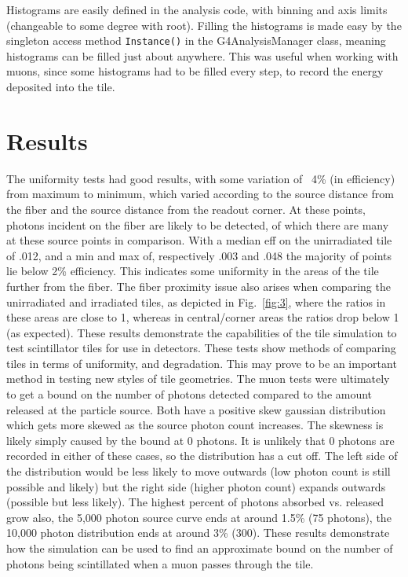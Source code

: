 \documentclass[11pt,twoside,a4paper,dn,final]{cms-tdr}
\begin{document}
	Histograms are easily defined in the analysis code, with binning and axis limits (changeable to some degree with root). Filling the histograms is made easy by the singleton access method \verb|Instance()| in the G4AnalysisManager class, meaning histograms can be filled just about anywhere. This was useful when working with muons, since some histograms had to be filled every step, to record the energy deposited into the tile. 


\section{Results}
	The uniformity tests had good results, with some variation of ~4\% (in efficiency) from maximum to minimum, which varied according to the source distance from the fiber and the source distance from the readout corner. At these points, photons incident on the fiber are likely to be detected, of which there are many at these source points in comparison. With a median eff on the unirradiated tile of .012, and a min and max of, respectively .003 and .048 the majority of points lie below 2\% efficiency. This indicates some uniformity in the areas of the tile further from the fiber. The fiber proximity issue also arises when comparing the unirradiated and irradiated tiles, as depicted in Fig.~\ref{fig:3}, where the ratios in these areas are close to 1, whereas in central/corner areas the ratios drop below 1 (as expected). These results demonstrate the capabilities of the tile simulation to test scintillator tiles for use in detectors. These tests show methods of comparing tiles in terms of uniformity, and degradation. This may prove to be an important method in testing new styles of tile geometries.
	The muon tests were ultimately to get a bound on the number of photons detected compared to the amount released at the particle source.  Both have a positive skew gaussian distribution which gets more skewed as the source photon count increases. The skewness is likely simply caused by the bound at 0 photons. It is unlikely that 0 photons are recorded in either of these cases, so the distribution has a cut off. The left side of the distribution would be less likely to move outwards (low photon count is still possible and likely) but the right side (higher photon count) expands outwards (possible but less likely). The highest percent of photons absorbed vs. released grow also, the 5,000 photon source curve ends at around 1.5\% (75 photons), the 10,000 photon distribution ends at around 3\% (300).  These results demonstrate how the simulation can be used to find an approximate bound on the number of photons being scintillated when a muon passes through the tile. 


\clearpage
\appendix
\end{document}

